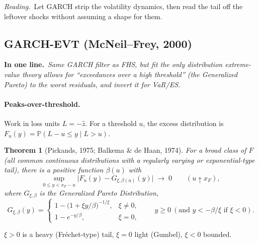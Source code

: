 \documentclass[11pt,a4paper]{article}
\newcommand{\Prob}{\mathbb{P}}
\newtheorem{theorem}{Theorem}
\newcommand{\intuition}[1]{\par\smallskip\noindent\textit{Reading.}\ #1\par\smallskip}
\newcommand{\inbrief}[1]{\par\noindent\textbf{In one line.}\ \textit{#1}\par\smallskip}
\begin{document}
\intuition{Let GARCH strip the volatility dynamics, then read the tail off the
leftover shocks without assuming a shape for them.}

\subsection{GARCH-EVT (McNeil--Frey, 2000)}\label{sec:evt}

\inbrief{Same GARCH filter as FHS, but fit the \emph{only} distribution
extreme-value theory allows for ``exceedances over a high threshold'' (the
Generalized Pareto) to the worst residuals, and invert it for VaR/ES.}

\paragraph{Peaks-over-threshold.} Work in loss units $L = -\hat z$. For a
threshold $u$, the excess distribution is
$F_u(y) = \Prob(L - u \le y \mid L > u)$.

\begin{theorem}[Pickands, 1975; Balkema \& de Haan, 1974]
For a broad class of $F$ (all common continuous distributions with a regularly
varying or exponential-type tail), there is a positive function $\beta(u)$ with
\begin{equation}
  \sup_{0\le y < x_F - u}\big| F_u(y) - G_{\xi,\beta(u)}(y)\big| \;\longrightarrow\; 0
  \qquad (u\uparrow x_F),
\end{equation}
where $G_{\xi,\beta}$ is the Generalized Pareto Distribution,
\begin{equation}
  G_{\xi,\beta}(y) =
  \begin{cases}
    1 - \big(1 + \xi y/\beta\big)^{-1/\xi}, & \xi\neq0,\\[2pt]
    1 - e^{-y/\beta}, & \xi = 0,
  \end{cases}
  \qquad y\ge0\ (\text{and } y < -\beta/\xi \text{ if } \xi<0).
\end{equation}
\end{theorem}
$\xi>0$ is a heavy (Fréchet-type) tail, $\xi=0$ light (Gumbel), $\xi<0$ bounded.
\end{document}
